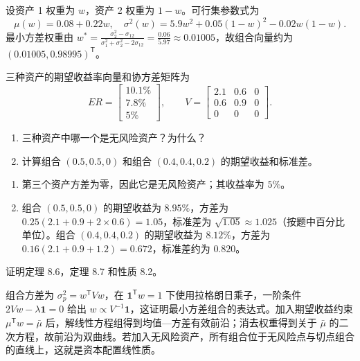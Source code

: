 \begin{solution}
设资产 1 权重为 $w$，资产 2 权重为 $1-w$。可行集参数式为
\[
\mu(w)=0.08+0.22w,\quad \sigma^2(w)=5.9w^2+0.05(1-w)^2-0.02w(1-w).
\]
最小方差权重由 $w^*=\frac{\sigma_2^2-\sigma_{12}}{\sigma_1^2+\sigma_2^2-2\sigma_{12}}=\frac{0.06}{5.97}\approx0.01005$，故组合向量约为 $(0.01005,0.98995)^{\mathsf T}$。
\end{solution}
\begin{problem}
 三种资产的期望收益率向量和协方差矩阵为
\[
    ER=\begin{bmatrix}10.1\%\\7.8\%\\5\%\end{bmatrix},\qquad
    V=\begin{bmatrix}
        2.1 & 0.6 & 0\\
        0.6 & 0.9 & 0\\
        0 & 0 & 0
    \end{bmatrix}.
\]
\begin{enumerate}[label=(\alph*)]
    \item 三种资产中哪一个是无风险资产？为什么？
    \item 计算组合 $(0.5,0.5,0)$ 和组合 $(0.4,0.4,0.2)$ 的期望收益和标准差。
\end{enumerate}
\end{problem}
\begin{solution}
\begin{enumerate}[label=(\alph*)]
\item 第三个资产方差为零，因此它是无风险资产；其收益率为 $5\%$。
\item 组合 $(0.5,0.5,0)$ 的期望收益为 $8.95\%$，方差为 $0.25(2.1+0.9+2\times0.6)=1.05$，标准差为 $\sqrt{1.05}\approx1.025$（按题中百分比单位）。组合 $(0.4,0.4,0.2)$ 的期望收益为 $8.12\%$，方差为 $0.16(2.1+0.9+1.2)=0.672$，标准差约为 $0.820$。
\end{enumerate}
\end{solution}
\begin{problem}
 证明定理 8.6，定理 8.7 和性质 8.2。
\end{problem}
\begin{solution}
组合方差为 $\sigma_p^2=w^{\mathsf T}Vw$，在 $\mathbf1^{\mathsf T}w=1$ 下使用拉格朗日乘子，一阶条件 $2Vw-\lambda\mathbf1=0$ 给出 $w\propto V^{-1}\mathbf1$，这证明最小方差组合的表达式。加入期望收益约束 $\mu^{\mathsf T}w=\bar\mu$ 后，解线性方程组得到均值—方差有效前沿；消去权重得到关于 $\bar\mu$ 的二次方程，故前沿为双曲线。若加入无风险资产，所有组合位于无风险点与切点组合的直线上，这就是资本配置线性质。
\end{solution}
